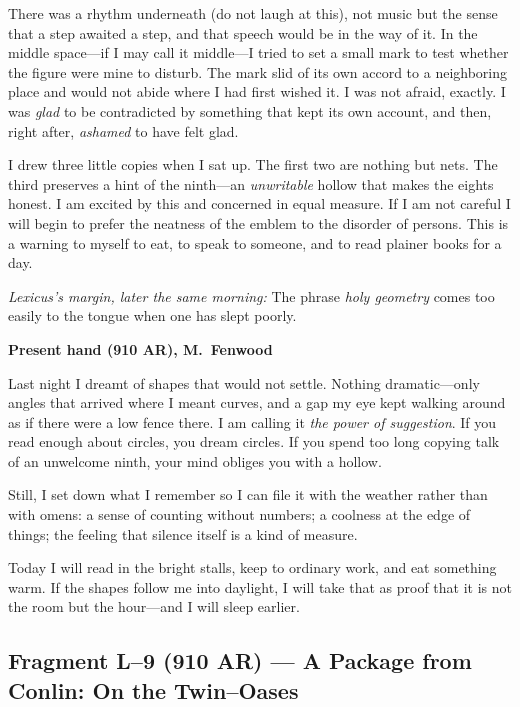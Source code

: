 \documentclass[11pt]{article}
\begin{document}
There was a rhythm underneath (do not laugh at this), not music but the sense that a step awaited a step, and that speech would be in the way of it. In the middle space—if I may call it middle—I tried to set a small mark to test whether the figure were mine to disturb. The mark slid of its own accord to a neighboring place and would not abide where I had first wished it. I was not afraid, exactly. I was \emph{glad} to be contradicted by something that kept its own account, and then, right after, \emph{ashamed} to have felt glad.

I drew three little copies when I sat up. The first two are nothing but nets. The third preserves a hint of the ninth—an \emph{unwritable} hollow that makes the eights honest. I am excited by this and concerned in equal measure. If I am not careful I will begin to prefer the neatness of the emblem to the disorder of persons. This is a warning to myself to eat, to speak to someone, and to read plainer books for a day.

\medskip
\noindent\textit{Lexicus’s margin, later the same morning:} The phrase \emph{holy geometry} comes too easily to the tongue when one has slept poorly.

\medskip
\noindent\textbf{Present hand (910 AR), M.\ Fenwood}

Last night I dreamt of shapes that would not settle. Nothing dramatic—only angles that arrived where I meant curves, and a gap my eye kept walking around as if there were a low fence there. I am calling it \emph{the power of suggestion}. If you read enough about circles, you dream circles. If you spend too long copying talk of an unwelcome ninth, your mind obliges you with a hollow.

Still, I set down what I remember so I can file it with the weather rather than with omens: a sense of counting without numbers; a coolness at the edge of things; the feeling that silence itself is a kind of measure.

Today I will read in the bright stalls, keep to ordinary work, and eat something warm. If the shapes follow me into daylight, I will take that as proof that it is not the room but the hour—and I will sleep earlier.

\subsection*{Fragment L--9 (910 AR) --- A Package from Conlin: On the Twin--Oases}
\label{frag:l9}
{}
\end{document}
